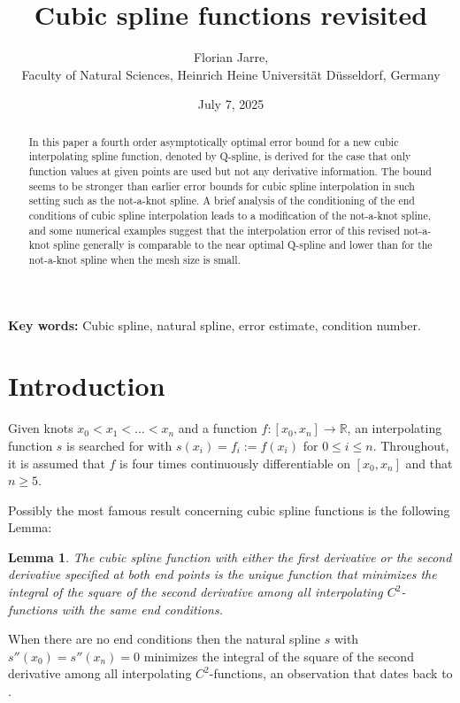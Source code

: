 \documentclass[12pt]{article}
\title {Cubic spline functions revisited}
\author{
  \small Florian Jarre, \\
  \small Faculty of Natural Sciences,
  Heinrich Heine Universit{\"a}t D\"usseldorf, Germany
}
\date  {July 7,  2025}
\newtheorem{lemma}{Lemma}
\def\re{{\mathbb{R}}}
\begin{document}
\maketitle 

\begin{abstract}
  In this paper a fourth order asymptotically optimal 
  error bound for a new cubic interpolating spline function,
  denoted by Q-spline, is derived
  for the case that only function values at
  given points are used but not any derivative information.
  The bound seems to be stronger
  than earlier error bounds for cubic spline interpolation in such setting
  such as the not-a-knot spline.
  A brief analysis of the conditioning of the end conditions of
  cubic spline interpolation leads to a modification of the 
  not-a-knot spline, and
  some numerical examples suggest that the interpolation error
  of this revised not-a-knot spline generally is
  comparable to the near optimal Q-spline and lower than for
  the not-a-knot spline when the mesh size is small.
\end{abstract}

\noindent
{\bf Key words:}
Cubic spline, natural spline, error estimate, condition number.









\section{Introduction}

Given knots $x_0<x_1<\ldots <x_n$ and a function $f:[x_0,x_n]\to \re$,
an interpolating function $s$ is searched for with $s(x_i)=f_i:=f(x_i)$
for $0\le i\le n$.
Throughout, it is assumed that $f$ is four times
continuously differentiable on $[x_0,x_n]$ and that $n\ge 5$.

Possibly the most famous result concerning cubic spline functions
is the following Lemma:

\begin{lemma}\label{lemma1}
  The cubic spline function with either the first derivative
  or the second derivative specified at both end points 
  is the unique function that
  minimizes the integral of the square
  of the second derivative among all interpolating $C^2$-functions
  with the same end conditions.
\end{lemma}

When there are no end conditions then the natural spline
$s$ with $s''(x_0)=s''(x_n)=0$ minimizes the integral of the square
of the second derivative among all interpolating $C^2$-functions,
an observation that dates back to \cite{Holladay}.
\end{document}
